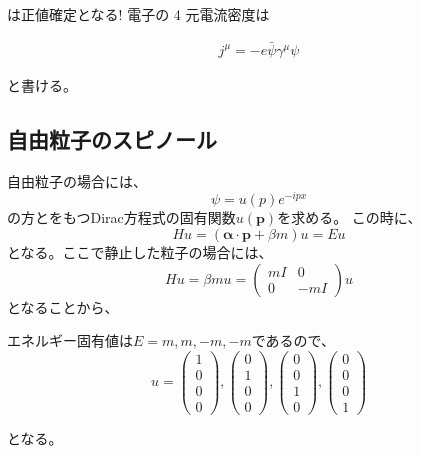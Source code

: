 \documentclass[titlepage]{ltjsarticle}
\begin{document}
は正値確定となる!
電子の 4 元電流密度は

\begin{align*}
j^\mu=-e \bar{\psi} \gamma^\mu \psi
\end{align*}


と書ける。


\subsection{自由粒子のスピノール}
自由粒子の場合には、
\begin{equation}
  \psi = u(p) e^{-ipx}
\end{equation}
の方とをもつDirac方程式の固有関数\(u(\bm{p})\)を求める。
この時に、
\begin{equation}
  Hu = (\bm{\alpha} \cdot \bm{p} + \beta m)u = Eu
\end{equation}
となる。ここで静止した粒子の場合には、
\begin{equation}
  Hu = \beta mu = 
  \begin{pmatrix}
    mI & 0 \\
    0 & -mI
  \end{pmatrix}u
\end{equation}
となることから、

エネルギー固有値は\(E= m,m,-m,-m\)であるので、
\begin{equation}
  u = 
  \begin{pmatrix}
    1 \\
    0 \\
    0 \\
    0
  \end{pmatrix}, 
  \begin{pmatrix}
    0 \\
    1 \\
    0 \\
    0
  \end{pmatrix},
  \begin{pmatrix}
    0 \\
    0 \\
    1 \\
    0
  \end{pmatrix},
  \begin{pmatrix}
    0 \\
    0 \\
    0 \\
    1
  \end{pmatrix}
\end{equation}

となる。
\end{document}
